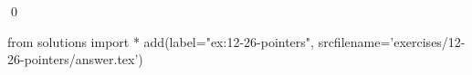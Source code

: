 
\begin{ex}
  \label{ex:12-26-pointers}
  
  \qed
\end{ex}
\begin{python0}
from solutions import *
add(label="ex:12-26-pointers",
    srcfilename='exercises/12-26-pointers/answer.tex')
\end{python0}
